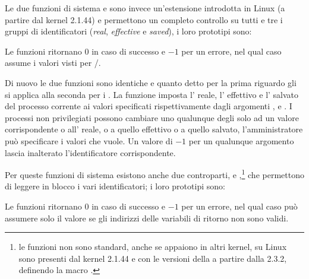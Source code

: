 Le due funzioni di sistema  e  sono invece
un'estensione introdotta in Linux (a partire dal kernel 2.1.44) e permettono
un completo controllo su tutti e tre i gruppi di identificatori
(\textit{real}, \textit{effective} e \textit{saved}), i loro prototipi sono:

\begin{funcproto}{ 
}
{Le funzioni ritornano $0$ in caso di successo e $-1$ per un errore, nel qual
caso  assume i valori visti per /.
}
\end{funcproto}

Di nuovo le due funzioni sono identiche e quanto detto per la prima riguardo
gli  si applica alla seconda per i .  La funzione
 imposta l' reale, l' effettivo e
l' salvato del processo corrente ai valori specificati
rispettivamente dagli argomenti ,  e .  I
processi non privilegiati possono cambiare uno qualunque degli  solo
ad un valore corrispondente o all' reale, o a quello effettivo o a
quello salvato, l'amministratore può specificare i valori che vuole. Un valore
di $-1$ per un qualunque argomento lascia inalterato l'identificatore
corrispondente.

Per queste funzioni di sistema esistono anche due controparti,
 e ,\footnote{le funzioni non sono standard,
  anche se appaiono in altri kernel, su Linux sono presenti dal kernel 2.1.44
  e con le versioni della  a partire dalla 2.3.2, definendo la
  macro .} che permettono di leggere in blocco i vari
identificatori; i loro prototipi sono:

\begin{funcproto}{ 
}
{Le funzioni ritornano $0$ in caso di successo e $-1$ per un errore, nel qual
  caso  può assumere solo il valore  se gli
  indirizzi delle variabili di ritorno non sono validi.  }
\end{funcproto}

